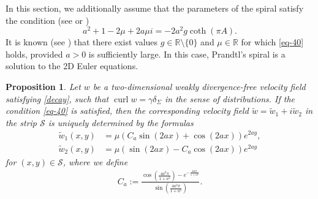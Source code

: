 \documentclass[11pt, letterpaper, reqno]{amsart}
\numberwithin{equation}{section}
\theoremstyle{definition}
\theoremstyle{plain}
\newtheorem{prop}[defi]{Proposition}
\numberwithin{equation}{section}
\def\R{\mathbb{R}}
\def\SS{\mathcal{S}}
\DeclareMathOperator{\curl}{curl}
\begin{document}
In this section, we additionally assume that the parameters of the spiral satisfy the condition (see \cite[eq. (1.18)]{CKO} or \cite{Elling})
\begin{equation}\label{eq-40}
a^2 + 1 - 2\mu + 2a\mu i = -2a^2 g \coth(\pi A). 
\end{equation}
It is known (see \cite{CKO}) that there exist values $g\in\R\setminus\{0\}$ and $\mu\in\R$ for which \eqref{eq-40} holds, provided $a>0$ is sufficiently large. In this case, Prandtl's spiral is a solution to the 2D Euler equations. 
\begin{prop}\label{wpasie}
Let $w$ be a two-dimensional weakly divergence-free velocity field satisfying \eqref{decay}, such that $\curl w=\gamma\delta_{\Sigma}$ in the sense of distributions. If the condition \eqref{eq-40} is satisfied, then the corresponding velocity field $\tilde{w}=\tilde{w}_1+i\tilde{w}_2$ in the strip $\SS$ is uniquely determined by the formulas
\begin{equation}\label{w-explicit}
\begin{aligned}
\tilde{w}_1(x,y)& =\mu (C_{a}\sin(2ax) + \cos(2ax) )e^{2ay}, \\
\tilde{w}_2(x,y)& =\mu (\sin(2ax) - C_{a} \cos(2ax) ) e^{2ay}
\end{aligned}
\end{equation}
for $(x,y)\in\SS$, where we define
\begin{align*}
C_{a}:=\frac{\cos\left(\frac{4a^2\pi}{1+a^2}\right) - e^{-\frac{4a\pi}{1+a^2}}}{\sin\left(\frac{4a^2\pi}{1+a^2}\right)}.
\end{align*}
\end{prop}
\end{document}

